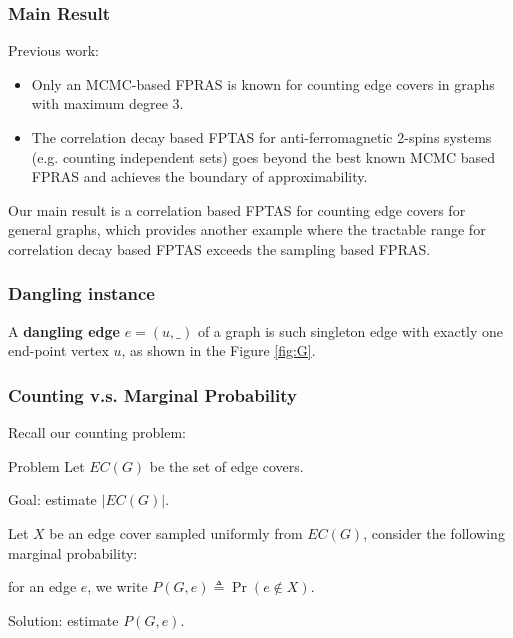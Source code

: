 \documentclass[mathserif]{beamer}
\newcommand{\abs}[1]{\left\vert#1\right\vert}
\begin{document}
\begin{frame}
	\frametitle{Main Result}
	Previous work:
	\begin{itemize}
		\item Only an MCMC-based FPRAS is known for counting edge covers in graphs with maximum degree $3$.
		\item The correlation decay based FPTAS for anti-ferromagnetic 2-spins systems (e.g. counting independent sets) goes beyond the best known MCMC based FPRAS and achieves the boundary of approximability.
	\end{itemize}

	\pause
	Our main result is a correlation based FPTAS for counting edge covers for general graphs, which provides another example where the tractable range for correlation decay based FPTAS exceeds the sampling based FPRAS.
\end{frame}

\begin{frame}
	\frametitle{Dangling instance} %

\begin{definition}
	A {\bf dangling edge} $e=(u,\_)$ of a graph is such singleton edge with exactly one end-point vertex $u$, as shown in the Figure \ref{fig:G}.
\end{definition}

\end{frame}

\begin{frame}
	\frametitle{Counting v.s. Marginal Probability}
	Recall our counting problem:
	\begin{block}{Problem}
	Let $EC(G)$ be the set of edge covers.

	Goal: estimate $\abs{EC(G)}$.
	\end{block}
	
	\pause
	Let $X$ be an edge cover sampled uniformly from $EC(G)$, consider the following marginal probability:

	for an edge $e$, we write $P(G,e) \triangleq \Pr ( e \notin X)$.

	\bigskip

	Solution: estimate $P(G,e)$.
\end{frame}
\end{document}
